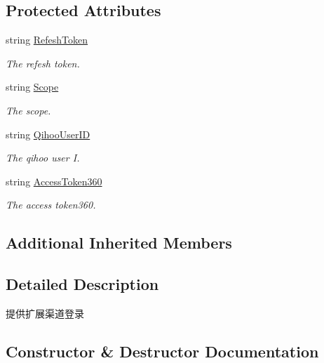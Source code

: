 \subsection*{Protected Attributes}
\begin{DoxyCompactItemize}
\item 
string \mbox{\hyperlink{class_t_net_1_1_contract_1_1_action_1_1_login_extend_action_aee10fb522dfa48f4d637d19d47b844ba}{Refesh\+Token}}
\begin{DoxyCompactList}\small\item\em The refesh token. \end{DoxyCompactList}\item 
string \mbox{\hyperlink{class_t_net_1_1_contract_1_1_action_1_1_login_extend_action_ac18afd1e25ea0ae62afc71da2f3d6eac}{Scope}}
\begin{DoxyCompactList}\small\item\em The scope. \end{DoxyCompactList}\item 
string \mbox{\hyperlink{class_t_net_1_1_contract_1_1_action_1_1_login_extend_action_ad32a0d799358c2f1194e01ed9c2a69fd}{Qihoo\+User\+ID}}
\begin{DoxyCompactList}\small\item\em The qihoo user I. \end{DoxyCompactList}\item 
string \mbox{\hyperlink{class_t_net_1_1_contract_1_1_action_1_1_login_extend_action_aa8d43cbdc5cd9184c5823e129a59de0a}{Access\+Token360}}
\begin{DoxyCompactList}\small\item\em The access token360. \end{DoxyCompactList}\end{DoxyCompactItemize}
\subsection*{Additional Inherited Members}


\subsection{Detailed Description}
提供扩展渠道登录 



\subsection{Constructor \& Destructor Documentation}
\mbox{\label{class_t_net_1_1_contract_1_1_action_1_1_login_extend_action_aa5de5e8a12a59797fdf4607da31ef3d9}} 
